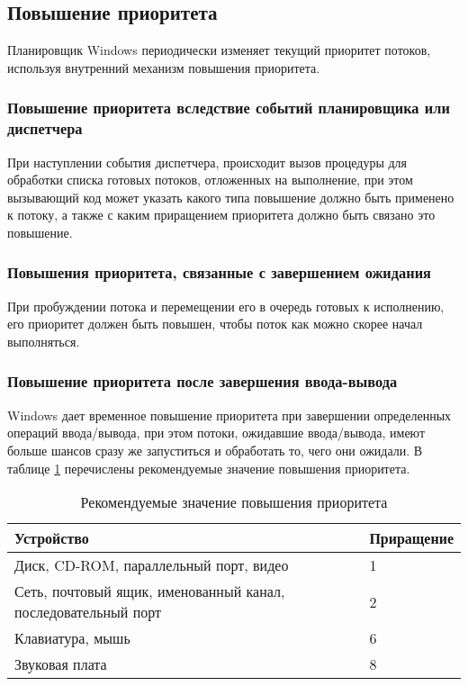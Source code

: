 
\subsection*{Повышение приоритета}

Планировщик Windows периодически изменяет текущий приоритет потоков, используя внутренний механизм повышения приоритета.

\subsubsection*{Повышение приоритета вследствие событий планировщика или диспетчера}

При наступлении события диспетчера, происходит вызов процедуры для обработки списка готовых потоков, отложенных на выполнение, при этом вызывающий код может указать какого типа повышение должно быть применено к потоку, а также с каким приращением приоритета должно быть связано это повышение.

\subsubsection*{Повышения приоритета, связанные с завершением ожидания}

При пробуждении потока и перемещении его в очередь готовых к исполнению, его приоритет должен быть повышен, чтобы поток как можно скорее начал выполняться.

\subsubsection*{Повышение приоритета после завершения ввода-вывода}

Windows дает временное повышение приоритета при завершении определенных операций ввода/вывода, при этом потоки, ожидавшие ввода/вывода, имеют больше шансов сразу же запуститься и обработать то, чего они ожидали.
В таблице \ref{tbl:io} перечислены рекомендуемые значение повышения приоритета.

\begin{table}[ht]
	\begin{center}
		\begin{threeparttable}
			\caption{Рекомендуемые значение повышения приоритета}
			\label{tbl:io}
		\begin{tabularx}{\textwidth}{|p{100mm}|X|}
			\hline
			\textbf{Устройство} & \textbf{Приращение} \\
			\hline
			Диск, CD-ROM, параллельный порт, видео & 1 \\
			\hline
			Сеть, почтовый ящик, именованный канал, последовательный порт & 2 \\
			\hline
			Клавиатура, мышь & 6 \\
			\hline
			Звуковая плата & 8 \\
			\hline
		\end{tabularx}
	\end{threeparttable}
	\end{center}
\end{table}

